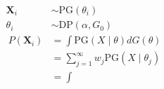 \documentclass[8pt]{article}
\begin{document}
\[
\begin{aligned}
    \bm{X}_i &\sim \text{PG}(\theta_i)\\
    \theta_i &\sim \text{DP}(\alpha, G_0)\\\
    P(\bm{X}_i) &= \int\text{PG}(X\mid\theta)dG(\theta)\\
        &= \sum_{j = 1}^{\infty}w_j\text{PG}(X\mid\theta_j)\\
        &= \int
    
\end{aligned}
\]



\end{document}
